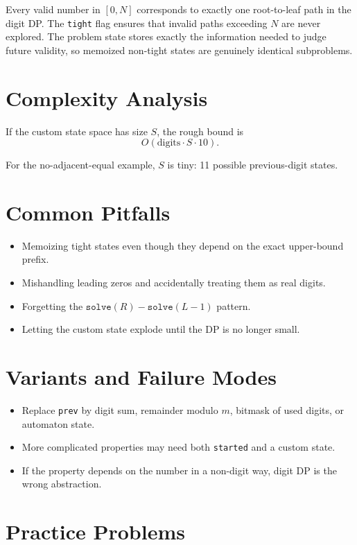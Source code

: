 Every valid number in \([0,N]\) corresponds to exactly one root-to-leaf path in the digit DP. The \texttt{tight} flag
ensures that invalid paths exceeding \(N\) are never explored. The problem state stores exactly the information needed
to judge future validity, so memoized non-tight states are genuinely identical subproblems.

\section*{Complexity Analysis}

If the custom state space has size \(S\), the rough bound is
\[
O(\text{digits} \cdot S \cdot 10).
\]

For the no-adjacent-equal example, \(S\) is tiny: 11 possible previous-digit states.

\section*{Common Pitfalls}

\begin{itemize}
  \item Memoizing tight states even though they depend on the exact upper-bound prefix.
  \item Mishandling leading zeros and accidentally treating them as real digits.
  \item Forgetting the \(\texttt{solve}(R) - \texttt{solve}(L-1)\) pattern.
  \item Letting the custom state explode until the DP is no longer small.
\end{itemize}

\section*{Variants and Failure Modes}

\begin{itemize}
  \item Replace \texttt{prev} by digit sum, remainder modulo \(m\), bitmask of used digits, or automaton state.
  \item More complicated properties may need both \texttt{started} and a custom state.
  \item If the property depends on the number in a non-digit way, digit DP is the wrong abstraction.
\end{itemize}

\section*{Practice Problems}

